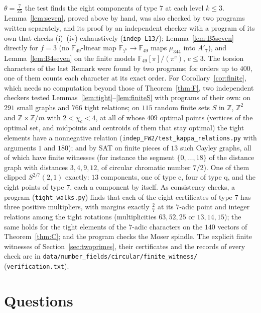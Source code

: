\documentclass[11pt,a4paper]{amsart}
\theoremstyle{remark}
\newcommand{\Z}{\mathbb{Z}}
\newcommand{\F}{\mathbb{F}}
\begin{document}
$\theta=\frac7{25}$ the test finds the eight components of type $7$ at each level $k\le3$. Lemma~\ref{lem:seven}, proved above by
hand, was also checked by two programs written separately, and its proof by an independent checker with a program
of its own that checks (i)--(iv) exhaustively (\nolinkurl{indep_L13/}); Lemma~\ref{lem:B5seven} directly for $f=3$ (no $\F_{49}$-linear map
$\F_{7^6}\to\F_{49}$ maps $\mu_{344}$ into $A'_7$), and Lemma~\ref{lem:B4seven} on the finite models
$\F_{49}[\pi]/(\pi^e)$, $e\le3$. The torsion characters of the last Remark were found by two programs; for orders up
to $400$, one of them counts each character at its exact order. For Corollary~\ref{cor:finite}, which needs no
computation beyond those of Theorem~\ref{thm:F}, two independent checkers tested Lemmas~\ref{lem:tight}--\ref{lem:finiteS}
with programs of their own: on $291$ small graphs and $766$ tight relations; on $115$ random finite sets $S$ in $\Z$,
$\Z^2$ and $\Z\times\Z/m$ with $2<\chi_c<4$, at all of whose $409$ optimal points (vertices of the optimal set, and
midpoints and centroids of them that stay optimal) the tight elements have a nonnegative relation
(\nolinkurl{indep_FW2/test_kappa_relations.py} with arguments $1$ and $180$); and by SAT on finite pieces of $13$ such Cayley graphs, all of which have finite witnesses
(for instance the segment $\{0,\dots,18\}$ of the distance graph with distances $3,4,9,12$, of circular chromatic
number $7/2$). One of them clipped $S^{2/7}(2,1)$ exactly: $13$ components, one of type c, four of type q, and the
eight points of type $7$, each a component by itself. As consistency checks, a program
(\nolinkurl{tight_walks.py}) finds that each of the eight certificates of type $7$ has three positive multipliers,
with margins exactly $\frac27$ at its $7$-adic point and integer relations among the tight rotations
(multiplicities $63,52,25$ or $13,14,15$); the same holds for the tight elements of the $7$-adic characters on the
$140$ vectors of Theorem~\ref{thm:C}; and the program checks the Moser spindle. The explicit finite witnesses of
Section~\ref{sec:twoprimes}, their certificates and the records of every check are in
\nolinkurl{data/number_fields/circular/finite_witness/} (\nolinkurl{verification.txt}).

\section{Questions}\label{sec:questions}
\end{document}
